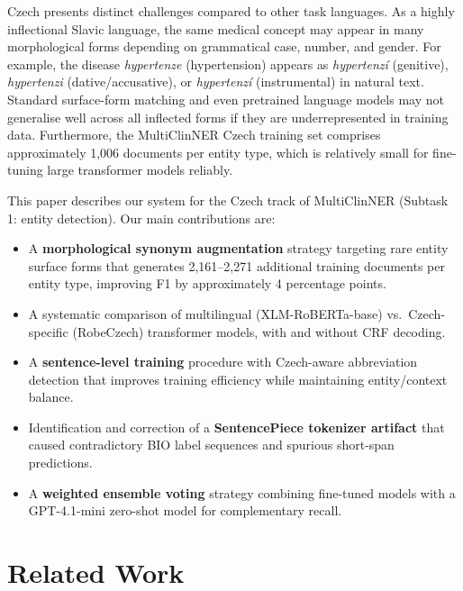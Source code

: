 \documentclass[11pt]{article}
\begin{document}
Czech presents distinct challenges compared to other task languages. As a highly inflectional Slavic
language, the same medical concept may appear in many morphological forms depending on grammatical
case, number, and gender. For example, the disease \textit{hypertenze} (hypertension) appears as
\textit{hypertenz\'{i}} (genitive), \textit{hypertenzi} (dative/accusative), or \textit{hypertenz\'{i}}
(instrumental) in natural text. Standard surface-form matching and even pretrained language models
may not generalise well across all inflected forms if they are underrepresented in training data.
Furthermore, the MultiClinNER Czech training set comprises approximately 1,006 documents per entity type,
which is relatively small for fine-tuning large transformer models reliably.

This paper describes our system for the Czech track of MultiClinNER (Subtask 1: entity detection).
Our main contributions are:

\begin{itemize}
  \item A \textbf{morphological synonym augmentation} strategy targeting rare entity surface forms
        that generates 2,161--2,271 additional training documents per entity type, improving
        F1 by approximately 4 percentage points.
  \item A systematic comparison of multilingual (XLM-RoBERTa-base) vs.\ Czech-specific
        (RobeCzech) transformer models, with and without CRF decoding.
  \item A \textbf{sentence-level training} procedure with Czech-aware abbreviation detection
        that improves training efficiency while maintaining entity/context balance.
  \item Identification and correction of a \textbf{SentencePiece tokenizer artifact} that
        caused contradictory BIO label sequences and spurious short-span predictions.
  \item A \textbf{weighted ensemble voting} strategy combining fine-tuned models with a
        GPT-4.1-mini zero-shot model for complementary recall.
\end{itemize}

\section{Related Work}
\end{document}
